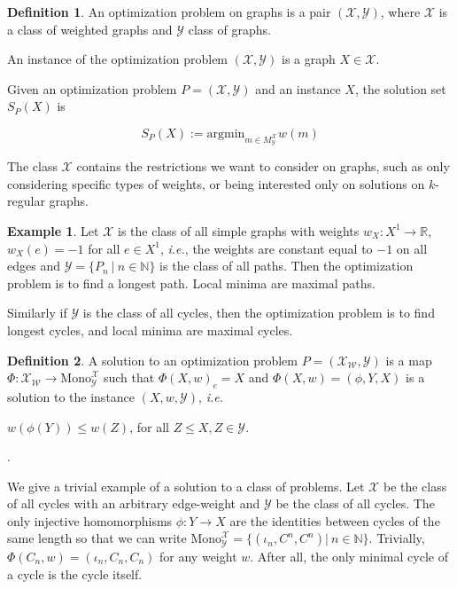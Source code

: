 \documentclass[]{article}
\theoremstyle{definition}
\newtheorem{definition}{Definition}[section]
\theoremstyle{definition}
\newtheorem{exmp}{Example}[section]
\newcommand{\raw}{\rightarrow}
\newcommand{\ie}{\textit{i.e.}}
\newcommand{\bb}{\mathbb}
\newcommand{\cax}{\mathcal{X}}
\newcommand{\cay}{\mathcal{Y}}
\newcommand{\caw}{\mathcal{W}}
\newcommand{\monoxy}{\text{Mono}_\mathcal{Y}^\mathcal{X}}
\begin{document}
\begin{definition}
	An optimization problem on graphs is a pair $(\mathcal{X}, \mathcal{Y})$, where $\mathcal{X}$ is a class of weighted graphs and $\mathcal{Y}$ class of graphs.
	
	An instance of the optimization problem $(\cax, \cay)$ is a graph $X \in \cax$.
	
	Given an optimization problem $P = (\cax, \cay)$ and an instance $X$, the solution set $S_P(X)$ is 
	
	\begin{center}
		$$S_P(X) := \text{argmin}_{m \in M^\cax_\cay} w(m)$$
		
	\end{center}
	
\end{definition}

The class $\mathcal{X}$ contains the restrictions we want to consider on graphs, such as only considering specific types of weights, or being interested only on solutions on $k$-regular graphs.

\begin{exmp}
	Let $\cax$ is the class of all simple graphs with weights $w_X: X^1 \raw \bb{R}$, $w_X(e) = -1$ for all $e \in X^1$, \ie, the weights are constant equal to $-1$ on all edges and $\cay = \{ P_n \ | \ n \in \bb{N} \}$ is the class of all paths. Then the optimization problem is to find a longest path. Local minima are maximal paths. 
	
	Similarly if $\cay$ is the class of all cycles, then the optimization problem is to find longest cycles, and local minima are maximal cycles.
\end{exmp}

\begin{definition}
	A solution to an optimization problem $P = (\cax_\caw, \cay)$ is a map $\Phi: \cax_\caw \raw \monoxy$ such that $\Phi(X, w)_e = X$ and $\Phi(X, w) = (\phi, Y, X)$ is a solution to the instance $(X, w, \cay)$, \ie 
	
	
	\begin{center}
		$w(\phi(Y)) \leq w(Z)$, for all $Z \leq X, Z \in \cay$.
	\end{center}.
\end{definition}

We give a trivial example of a solution to a class of problems. Let $\cax$ be the class of all cycles with an arbitrary edge-weight and $\cay$ be the class of all cycles. The only injective homomorphisms $\phi: Y \raw X $ are the identities between cycles of the same length so that we can write $\monoxy = \{ (\iota_n, C^n, C^n)| \ n \in \bb{N} \}$. Trivially, $\Phi(C_n, w) = (\iota_n, C_n, C_n)$ for any weight $w$. After all, the only minimal cycle of a cycle is the cycle itself.
\end{document}
